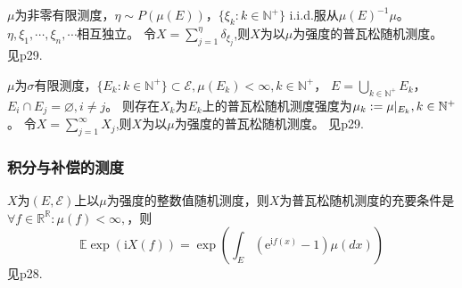 \documentclass[main]{subfiles}
\begin{document}
\begin{theorem}\label{the:普瓦松随机测度的存在性}
  \(\mu\)为非零有限测度，\(\eta \sim P(\mu(E))\)，\(\{\xi_k:k \in \mathbb{N}^+\}\) i.i.d.服从\(\mu(E)^{-1}\mu\)。\(\eta,\xi_1,\cdots,\xi_n,\cdots\)相互独立。
  令\(X=\sum_{j=1}^{\eta} \delta_{\xi_j}\),则\(X\)为以\(\mu\)为强度的普瓦松随机测度。
  见p29.
\end{theorem}
\begin{theorem}\label{the:1.5.5}
  \(\mu\)为\(\sigma\)有限测度，\(\{E_k:k \in \mathbb{N}^+\}\subset \mathcal{E},\mu(E_k)<\infty,k \in \mathbb{N}^+\)，
  \(E=\bigcup_{k \in \mathbb{N}^+}E_k\)，\(E_i \cap E_j=\varnothing,i \neq j\)。
  则存在\(X_k\)为\(E_k\)上的普瓦松随机测度强度为\(\mu_k:=\mu|_{E_k},k \in \mathbb{N}^+\)。
  令\(X=\sum_{j=1}^{\infty} X_j\),则\(X\)为以\(\mu\)为强度的普瓦松随机测度。
  见p29.
\end{theorem}
\subsubsection{积分与补偿的测度}
\begin{theorem}\label{the:普瓦松随机测度的充要条件2}
  \(X\)为\((E,\mathcal{E})\)上以\(\mu\)为强度的整数值随机测度，则\(X\)为普瓦松随机测度的充要条件是
  \(\forall f \in \mathbb{R}^{\mathbb{R}}:\mu(f)< \infty ,\)，则\[
    \mathbb{E}\exp(\mathrm{i}X(f))=\exp(\int_{E}(\mathrm{e}^{\mathrm{i}f(x)}-1)\mu(dx))
  \]
  见p28.
\end{theorem}

\ifSubfilesClassLoaded{%
  \printindex }{%
}
\end{document}

